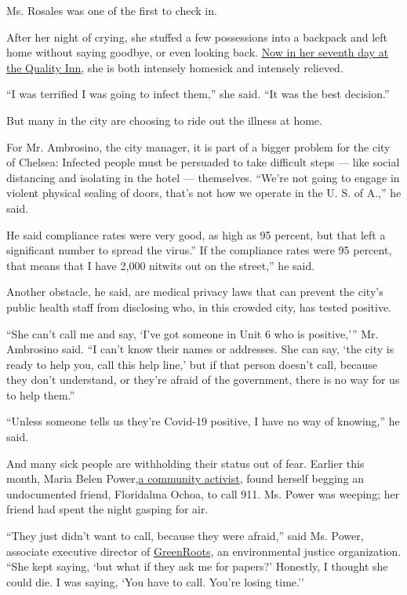 Ms. Rosales was one of the first to check in.

After her night of crying, she stuffed a few possessions into a backpack
and left home without saying goodbye, or even looking back.
\href{https://www.cbsnews.com/news/contact-tracing-deployed-in-effort-to-fight-coronavirus/}{Now
in her seventh day at the Quality Inn}, she is both intensely homesick
and intensely relieved.

``I was terrified I was going to infect them,'' she said. ``It was the
best decision.''

But many in the city are choosing to ride out the illness at home.

For Mr. Ambrosino, the city manager, it is part of a bigger problem for
the city of Chelsea: Infected people must be persuaded to take difficult
steps --- like social distancing and isolating in the hotel ---
themselves. ``We're not going to engage in violent physical sealing of
doors, that's not how we operate in the U. S. of A.,'' he said.

He said compliance rates were very good, as high as 95 percent, but that
left a significant number to spread the virus.'' If the compliance rates
were 95 percent, that means that I have 2,000 nitwits out on the
street,'' he said.

Another obstacle, he said, are medical privacy laws that can prevent the
city's public health staff from disclosing who, in this crowded city,
has tested positive.

``She can't call me and say, `I've got someone in Unit 6 who is
positive,''' Mr. Ambrosino said. ``I can't know their names or
addresses. She can say, `the city is ready to help you, call this help
line,' but if that person doesn't call, because they don't understand,
or they're afraid of the government, there is no way for us to help
them.''

``Unless someone tells us they're Covid-19 positive, I have no way of
knowing,'' he said.

And many sick people are withholding their status out of fear. Earlier
this month, Maria Belen
Power,\href{http://www.greenrootschelsea.org/team}{a community
activist}, found herself begging an undocumented friend, Floridalma
Ochoa, to call 911. Ms. Power was weeping; her friend had spent the
night gasping for air.

``They just didn't want to call, because they were afraid,'' said Ms.
Power, associate executive director of
\href{http://www.greenrootschelsea.org/}{GreenRoots}, an environmental
justice organization. ``She kept saying, `but what if they ask me for
papers?' Honestly, I thought she could die. I was saying, `You have to
call. You're losing time.''

